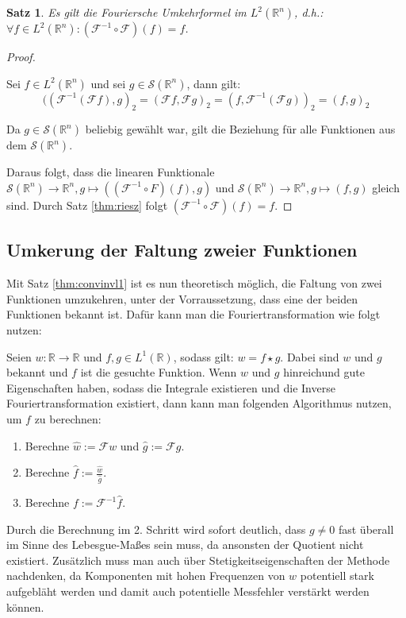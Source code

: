 \documentclass{article}
\newcommand{\R}[0]{\mathbb{R}}
\newcommand{\F}[0]{\mathcal{F}}
\newcommand{\Ssp}[0]{\mathcal{S}}
\theoremstyle{plain}
\newtheorem{thm}{Satz}[section]
\theoremstyle{definition}
\begin{document}
\begin{thm}
    Es gilt die Fouriersche Umkehrformel im $L^2(\R^n)$, d.h.: $\forall f \in L^2(\R^n): (\F^{-1} \circ \F)(f) = f$.
\end{thm}

\begin{proof}\cite[S. 428, Theorem 24.1.2]{ebert2018methods}

    Sei $f \in L^2(\R^n)$ und sei $g \in \Ssp(\R^n)$, dann gilt:
    \begin{equation}
        ((\F^{-1}(\F f), g)_2 = (\F f, \F g)_2 = (f, \F^{-1}(\F g))_2 = (f, g)_2
    \end{equation}

    Da $g \in \Ssp(\R^n)$ beliebig gewählt war, gilt die Beziehung für alle Funktionen aus dem $\Ssp(\R^n)$. 
    
    Daraus folgt, dass die linearen Funktionale $\Ssp(\R^n) \to \R^n, g \mapsto ((\F^{-1} \circ F)(f), g)$ und $\Ssp(\R^n) \to \R^n, g \mapsto (f, g)$ gleich sind.
    Durch Satz \ref{thm:riesz} folgt $(\F^{-1} \circ \F)(f) = f$.
\end{proof}

\subsection{Umkerung der Faltung zweier Funktionen}

Mit Satz \ref{thm:convinvl1} ist es nun theoretisch möglich, die Faltung von zwei Funktionen umzukehren, unter der Vorraussetzung, 
dass eine der beiden Funktionen bekannt ist. Dafür kann man die Fouriertransformation wie folgt nutzen:

Seien $w: \R \to \R$ und $f, g \in L^1(\R)$, sodass gilt: $w = f \star g$. Dabei sind $w$ und $g$ bekannt und $f$ ist die gesuchte Funktion.
Wenn $w$ und $g$ hinreichund gute Eigenschaften haben, sodass die Integrale existieren und die Inverse Fouriertransformation existiert, dann kann
man folgenden Algorithmus nutzen, um $f$ zu berechnen:
\begin{enumerate}
    \item Berechne $\hat{w} := \mathcal{F}w$ und $\hat{g} := \mathcal{F}g$.
    \item Berechne $\hat{f} := \frac{\hat{w}}{\hat{g}}$.
    \item Berechne $f := \mathcal{F}^{-1}\hat{f}$.
\end{enumerate}

Durch die Berechnung im 2. Schritt wird sofort deutlich, dass $g \neq 0$ fast überall im Sinne des Lebesgue-Maßes sein muss,
da ansonsten der Quotient nicht existiert. Zusätzlich muss man auch über Stetigkeitseigenschaften der Methode nachdenken,
da Komponenten mit hohen Frequenzen von $w$ potentiell stark aufgebläht werden 
und damit auch potentielle Messfehler verstärkt werden können.
\end{document}
